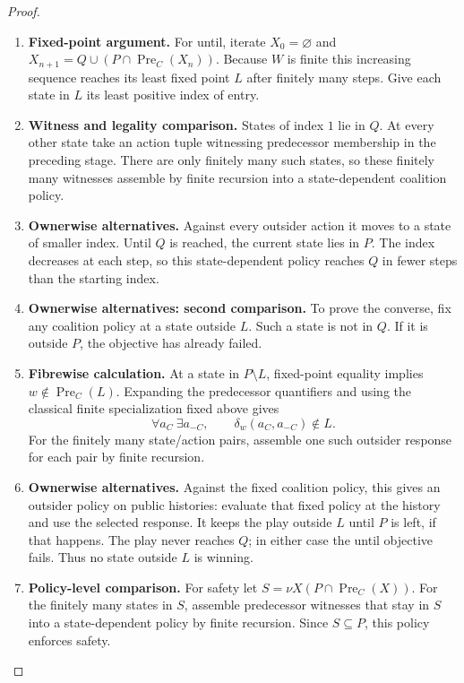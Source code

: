 \documentclass[11pt,a4paper]{article}
\numberwithin{equation}{section}
\theoremstyle{definition}
\theoremstyle{remark}
\theoremstyle{plain}
\begin{document}
\begin{proof}
\leavevmode
\begin{enumerate}[label=\textup{(\arabic*)},leftmargin=*,itemsep=4pt,topsep=3pt]
  \item \textbf{Fixed-point argument.} For until, iterate $X_0=\varnothing$ and
$X_{n+1}=Q\cup(P\cap\operatorname{Pre}_C(X_n))$. Because $W$ is finite this increasing sequence reaches its least fixed
point $L$ after finitely many steps. Give each state in $L$ its least
positive index of entry.
  \item \textbf{Witness and legality comparison.} States of index $1$ lie in $Q$. At every
other state take an action tuple witnessing predecessor membership in
the preceding stage. There are only finitely many such states, so these
finitely many witnesses assemble by finite recursion into a
state-dependent coalition policy.
  \item \textbf{Ownerwise alternatives.} Against every outsider action it moves
to a state of smaller index. Until $Q$ is reached, the current state lies
in $P$. The index decreases at each step, so this state-dependent
policy reaches $Q$ in fewer steps than the starting index.
  \item \textbf{Ownerwise alternatives: second comparison.} To prove the converse, fix any coalition policy at a state outside
$L$. Such a state is not in $Q$. If it is outside $P$, the objective
has already failed.
  \item \textbf{Fibrewise calculation.} At a state in $P\setminus L$, fixed-point equality implies
$w\notin\operatorname{Pre}_C(L)$. Expanding the predecessor quantifiers and
using the classical finite specialization fixed above gives
\[
 \forall a_C\ \exists a_{-C},\qquad
       \delta_w(a_C,a_{-C})\notin L.
\]
For the finitely many state/action pairs, assemble one such outsider
response for each pair by finite recursion.
  \item \textbf{Ownerwise alternatives.} Against the fixed coalition
policy, this gives an outsider policy on public histories: evaluate that fixed policy at
the history and use the selected response. It keeps the play outside
$L$ until $P$ is left, if that happens. The play never reaches $Q$;
in either case the until objective fails. Thus no state outside $L$
is winning.
  \item \textbf{Policy-level comparison.} For safety let $S=\nu X(P\cap\operatorname{Pre}_C(X))$. For the finitely many states in $S$, assemble predecessor witnesses
that stay in $S$ into a state-dependent policy by finite recursion. Since $S\subseteq P$, this policy enforces safety.

\end{enumerate}
\end{proof}
\end{document}
